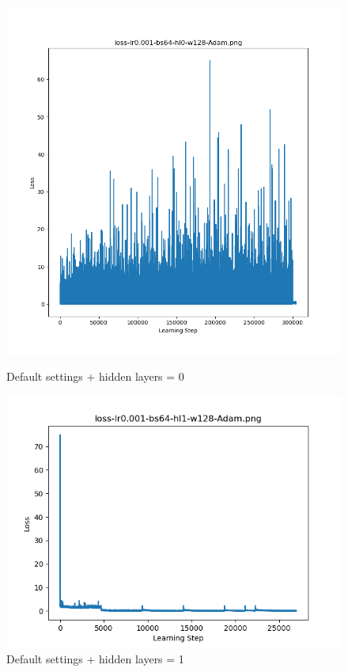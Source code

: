 \documentclass{article}[12pt]
\begin{document}
    \begin{figure}[H]
        \includegraphics[width=\linewidth]{testsResults/loss/hl/hl0loss.png}
        \caption{Default settings + hidden layers = 0}
        \endminipage\hfill
        \includegraphics[width=\linewidth]{testsResults/loss/hl/loss-lr0.001-bs64-hl1-w128-Adam.png}
        \caption{Default settings + hidden layers = 1}
        \endminipage
    \end{figure}
\end{document}
